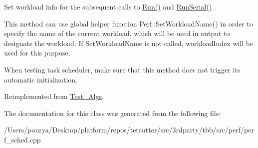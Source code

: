 Set workload info for the subsequent calls to \hyperlink{classTest__PFor__Nested_aec54294278d15e3d49f900fc419ca234}{Run()} and \hyperlink{classTest__PFor__Nested_af72783c3a7cc4f010d0484058af2ed34}{Run\+Serial()} 

This method can use global helper function Perf\+::\+Set\+Workload\+Name() in order to specify the name of the current workload, which will be used in output to designate the workload. If Set\+Workload\+Name is not called, workload\+Index will be used for this purpose.

When testing task scheduler, make sure that this method does not trigger its automatic initialization. 

Reimplemented from \hyperlink{classTest__Algs_a18ccd1cedb43cdbb4fce546a1abba490}{Test\+\_\+\+Algs}.



The documentation for this class was generated from the following file\+:\begin{DoxyCompactItemize}
\item 
/\+Users/pourya/\+Desktop/platform/repos/tetcutter/src/3rdparty/tbb/src/perf/perf\+\_\+sched.\+cpp\end{DoxyCompactItemize}

